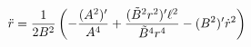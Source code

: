 \begin{equation}
\ddot{r}={1\over 2B^{2}}\left(
-{(A^{2})'\over A^{4}} +{(\tilde{B}^{2}r^{2})' \ell^{2}\over
\tilde{B}^{4}r^{4}} -(B^{2})'\dot{r}^{2}\right)
\label{eq:ddotr}
\end{equation}

